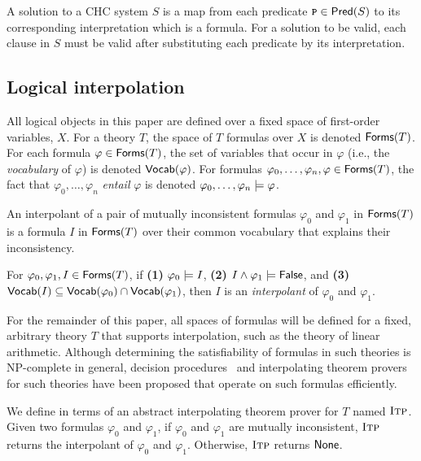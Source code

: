 A solution to a CHC system $S$ is a map from each predicate $\cc{P}
\in \predof{S}$ to its corresponding interpretation which is a
formula.
%
For a solution to be valid, each clause in $S$ must be valid after
substituting each predicate by its interpretation.

\subsection{Logical interpolation}
\label{sec:itps}
%
All logical objects in this paper are defined over a fixed space of first-order
variables, $X$.
%
For a theory $T$, the space of $T$
formulas over $X$ is denoted $\mathsf{Forms}( T )$.
%
For each formula $\varphi \in \mathsf{Forms}( T )$, the set of
variables that occur in $\varphi$ (i.e., the \emph{vocabulary} of
$\varphi$) is denoted $\mathsf{Vocab}(\varphi)$.
%
For formulas $\varphi_0, \ldots, \varphi_n, \varphi \in
\mathsf{Forms}( T )$, the fact that $\varphi_0, \ldots, \varphi_n$
\emph{entail} $\varphi$ is denoted $\varphi_0, \ldots, \varphi_n
\models \varphi$.


An interpolant of a pair of mutually inconsistent formulas
$\varphi_0$ and $\varphi_1$ in $\mathsf{Forms}( T )$ is a formula $I$ in $\mathsf{Forms}( T )$ over 
their common vocabulary that explains their inconsistency.
%
\begin{defn}
  \label{defn:itps}
  For $\varphi_0, \varphi_1, I \in \mathsf{Forms}( T )$, if
  \textbf{(1)} $\varphi_0 \models I$, %
  \textbf{(2)} $I \land \varphi_1 \models \mathsf{False}$, and %
  \textbf{(3)} $\mathsf{Vocab}(I) \subseteq \mathsf{Vocab}(\varphi_0) \cap
  \mathsf{Vocab}(\varphi_1)$,
  then $I$ is an \emph{interpolant} of $\varphi_0$ and $\varphi_1$.
\end{defn}
%
For the remainder of this paper, all spaces of formulas will be
defined for a fixed, arbitrary theory $T$ that supports
interpolation, such as the theory of linear
arithmetic.
Although determining the satisfiability of formulas in such theories
is NP-complete in general, decision procedures~\cite{moura08} and
interpolating theorem provers~\cite{mcmillan04} for such theories have
been proposed that operate on such formulas efficiently.
%

%
We define \sys in terms of an abstract interpolating theorem
prover for $T$ named $\textsc{Itp}$.
%
Given two formulas $\varphi_0$ and $\varphi_1$, if $\varphi_0$ and $\varphi_1$ are mutually 
inconsistent, $\textsc{Itp}$ returns the interpolant of $\varphi_0$ and $\varphi_1$.
%
Otherwise, $\textsc{Itp}$ returns $\mathsf{None}$.

